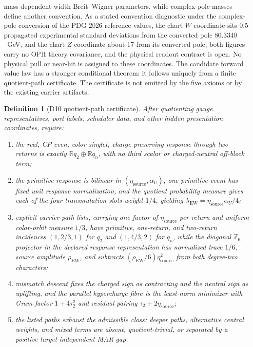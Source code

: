 \documentclass[11pt]{article}
\newtheorem{definition}[theorem]{Definition}
\begin{document}
mass-dependent-width Breit--Wigner parameters, while complex-pole masses define another
convention. As a stated convention diagnostic under the complex-pole conversion of the
PDG 2026 reference values, the chart \(W\) coordinate sits \(0.5\) propagated experimental
standard deviations from the converted pole \(80.3340\)~GeV, and the chart \(Z\)
coordinate about \(17\) from its converted pole; both figures carry no OPH theory
covariance, and the physical readout contract is open. No physical pull or
near-hit is assigned to these coordinates.
The candidate forward value law has a stronger conditional theorem: it follows
uniquely from a finite quotient-path certificate.  The certificate is not
emitted by the five axioms or by the existing carrier artifacts.

\begin{definition}[D10 quotient-path certificate]\label{def:particle-d10-qt}
After quotienting gauge representatives, port labels, scheduler data, and
other hidden presentation coordinates, require:
\begin{enumerate}[leftmargin=2em,label=\textup{QT\arabic*.}]
\item the real, CP-even, color-singlet, charge-preserving response through two
returns is exactly \(\mathbb Rq_2\oplus\mathbb Rq_n\), with no third scalar or
charged-neutral off-block term;
\item the primitive response is bilinear in
\((\eta_{\mathrm{source}},\alpha_U)\), one primitive event has fixed unit
response normalization, and the quotient probability measure gives each of
the four transmutation slots weight \(1/4\), yielding
\(\lambda_{\mathrm{EW}}=\eta_{\mathrm{source}}\alpha_U/4\);
\item explicit carrier path lists, carrying one factor of
\(\eta_{\mathrm{source}}\) per return and uniform color-orbit measure \(1/3\),
have primitive, one-return, and two-return incidences
\((1,2/3,1)\) for \(q_2\) and \((1,4/3,2)\) for \(q_n\), while the diagonal
\(\mathbb Z_6\) projector in the declared response representation has
normalized trace \(1/6\), source amplitude \(\rho_{\mathrm{EW}}\), and subtracts
\((\rho_{\mathrm{EW}}/6)\eta_{\mathrm{source}}^2\) from both degree-two
characters;
\item mismatch descent fixes the charged sign as contracting and the neutral
sign as uplifting, and the parallel hypercharge fibre is the least-norm
minimizer with Gram factor \(1+4\tau_2^2\) and residual pairing
\(\tau_2+2\eta_{\mathrm{source}}\);
\item the listed paths exhaust the admissible class: deeper paths,
alternative central weights, and mixed terms are absent, quotient-trivial, or
separated by a positive target-independent MAR gap.
\end{enumerate}
\end{definition}
\end{document}
